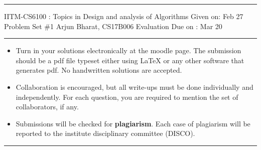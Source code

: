 \documentclass[solution,addpoints,12pt]{exam}
\begin{document}
\hrule
\vspace{3mm}
\noindent 
{\sf IITM-CS6100 : Topics in Design and analysis of Algorithms  \hfill Given on: Feb 27}
\vspace{3mm}\\
\noindent 
{\sf Problem Set \#1 \hfill Arjun Bharat, CS17B006}
{\hfill \sf Evaluation Due on : Mar 20 }
\vspace{3mm}
\hrule
{\small
\begin{itemize}
\item Turn in your solutions electronically at the moodle page. The submission should be a pdf file typeset either using     LaTeX or any other software that generates pdf. No handwritten solutions are accepted. 
\item Collaboration is encouraged, but all write-ups must be done
  individually and independently. For each question, you are required to mention the set of collaborators, if any.  
 \item Submissions will be checked for {\bf plagiarism}. Each case of plagiarism will be reported to the institute disciplinary committee (DISCO). 
\end{itemize}}
\hrule
\vspace{3mm}
\end{document}
